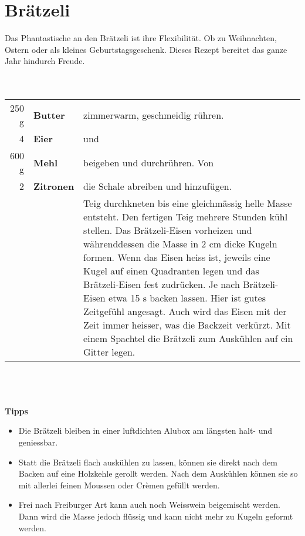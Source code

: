 \section{Brätzeli}
Das Phantastische an den Brätzeli ist ihre Flexibilität. Ob zu Weihnachten, Ostern oder als kleines Geburtstagsgeschenk. Dieses Rezept bereitet das ganze Jahr hindurch Freude.
\\
\\
\\
\begin{tabularx}{\linewidth}{r>{\bfseries\textbf}lX}
	250 g & Butter & zimmerwarm, geschmeidig rühren.\\
	4 & Eier & und\\
	600 g & Mehl & beigeben und durchrühren. Von\\
	2 & Zitronen & die Schale abreiben und hinzufügen.\\
	& & Teig durchkneten bis eine gleichmässig helle Masse entsteht. Den fertigen Teig mehrere Stunden kühl stellen.\newline \newline
		Das Brätzeli-Eisen vorheizen und währenddessen die Masse in 2 cm dicke Kugeln formen. Wenn das Eisen heiss ist, jeweils eine Kugel auf einen Quadranten legen und das Brätzeli-Eisen fest zudrücken. Je nach Brätzeli-Eisen etwa 15 s backen lassen. Hier ist gutes Zeitgefühl angesagt. Auch wird das Eisen mit der Zeit immer heisser, was die Backzeit verkürzt. Mit einem Spachtel die Brätzeli zum Auskühlen auf ein Gitter legen.
\end{tabularx}
\\
\\
\\
\textbf{Tipps}
\begin{itemize}
	\item Die Brätzeli bleiben in einer luftdichten Alubox am längsten halt- und geniessbar.
	\item Statt die Brätzeli flach auskühlen zu lassen, können sie direkt nach dem Backen auf eine Holzkehle gerollt werden. Nach dem Auskühlen können sie so mit allerlei feinen Moussen oder Crèmen gefüllt werden.
	\item Frei nach Freiburger Art kann auch noch Weisswein beigemischt werden. Dann wird die Masse jedoch flüssig und kann nicht mehr zu Kugeln geformt werden.
\end{itemize}
\newpage

